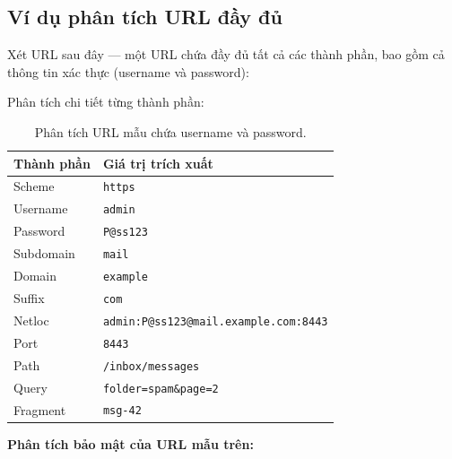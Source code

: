 \documentclass[a4paper,12pt]{article}
\begin{document}
\subsection{Ví dụ phân tích URL đầy đủ}

Xét URL sau đây --- một URL chứa đầy đủ tất cả các thành phần, bao gồm cả thông tin xác thực (username và password):

\begin{center}
\end{center}

\vspace{0.5cm}

Phân tích chi tiết từng thành phần:

\begin{table}[H]
\centering
\caption{Phân tích URL mẫu chứa username và password.}
\label{tab:url_example}
\begin{tabular}{ll}
\toprule
\textbf{Thành phần} & \textbf{Giá trị trích xuất} \\
\midrule
Scheme     & \texttt{https} \\
Username   & \texttt{admin} \\
Password   & \texttt{P@ss123} \\
Subdomain  & \texttt{mail} \\
Domain     & \texttt{example} \\
Suffix     & \texttt{com} \\
Netloc     & \texttt{admin:P@ss123@mail.example.com:8443} \\
Port       & \texttt{8443} \\
Path       & \texttt{/inbox/messages} \\
Query      & \texttt{folder=spam\&page=2} \\
Fragment   & \texttt{msg-42} \\
\bottomrule
\end{tabular}
\end{table}

\textbf{Phân tích bảo mật của URL mẫu trên:}
\end{document}
